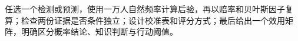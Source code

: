\begin{tcolorbox}[breakable,colback=white,colframe=blue!30!black,title={本章研读任务},fonttitle=\bfseries]
任选一个检测或预测，使用一万人自然频率计算后验，再以赔率和贝叶斯因子复算；检查两份证据是否条件独立；设计校准表和评分方式；最后给出一个效用矩阵，明确区分概率结论、知识判断与行动阈值。
\end{tcolorbox}
